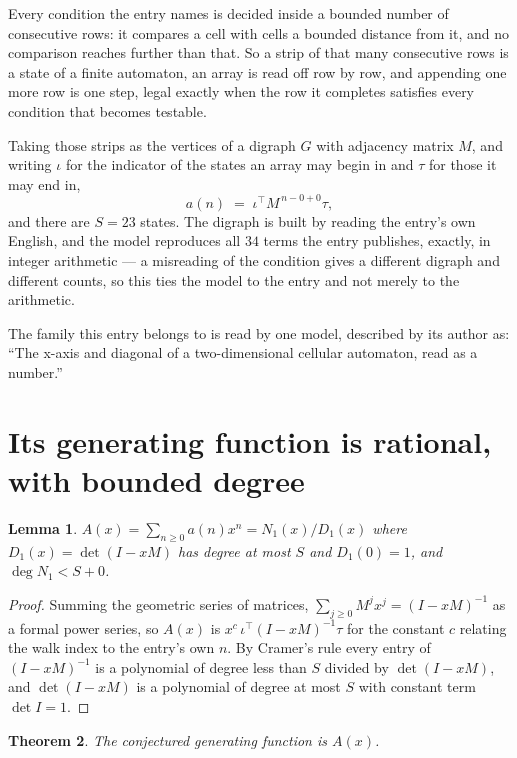 \documentclass[11pt,a4paper]{article}
\theoremstyle{plain}
\newtheorem{theorem}{Theorem}
\newtheorem{lemma}[theorem]{Lemma}
\theoremstyle{definition}
\begin{document}
Every condition the entry names is decided inside a bounded number of consecutive rows: it
compares a cell with cells a bounded distance from it, and no comparison reaches further than
that. So a strip of that many consecutive rows is a state of a finite automaton, an array is
read off row by row, and appending one more row is one step, legal exactly when the row it
completes satisfies every condition that becomes testable.

Taking those strips as the vertices of a digraph $G$ with adjacency matrix $M$, and writing
$\iota$ for the indicator of the states an array may begin in and $\tau$ for those it may end
in,
\[
a(n)\;=\;\iota^{\!\top}M^{\,n-0+0}\tau ,
\]
and there are $S=23$ states. The digraph is built by reading the entry's own English, and the
model reproduces all $34$ terms the entry publishes, exactly, in integer arithmetic --- a
misreading of the condition gives a different digraph and different counts, so this ties the
model to the entry and not merely to the arithmetic.

The family this entry belongs to is read by one model, described by its author as: ``The x-axis and diagonal of a two-dimensional cellular automaton, read as a number.''


\section{Its generating function is rational, with bounded degree}

\begin{lemma}\label{lem:rat}
$A(x)=\sum_{n\ge0}a(n)x^n=N_1(x)/D_1(x)$ where $D_1(x)=\det(I-xM)$ has degree at most
$S$ and $D_1(0)=1$, and $\deg N_1<S+0$.
\end{lemma}

\begin{proof}
Summing the geometric series of matrices, $\sum_{j\ge0}M^jx^j=(I-xM)^{-1}$ as a formal
power series, so $A(x)$ is $x^{c}\,\iota^{\!\top}(I-xM)^{-1}\tau$ for the constant $c$
relating the walk index to the entry's own $n$. By Cramer's rule every entry of
$(I-xM)^{-1}$ is a polynomial of degree less than $S$ divided by $\det(I-xM)$, and
$\det(I-xM)$ is a polynomial of degree at most $S$ with constant term $\det I=1$.
\end{proof}

\begin{theorem}
The conjectured generating function is $A(x)$.
\end{theorem}
\end{document}
